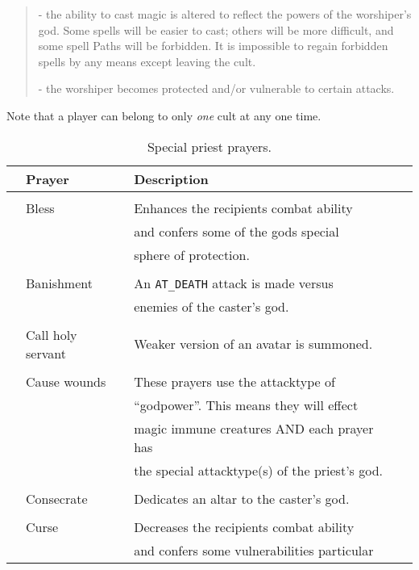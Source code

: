 {{{\begin{quote}
- the ability to cast magic is altered to reflect the powers
of the worshiper's god. Some spells will be easier to cast; others
will be more difficult, and some spell Paths will be forbidden.
It is impossible to regain forbidden spells by any means except
leaving the cult.

- the worshiper becomes protected and/or vulnerable to certain attacks.
\end{quote}
Note that a player can belong to only {\em one} cult at any one time.

\begin{table}
\begin{center}
\footnotesize
\caption{Special priest prayers. \label{tab:priest_prayer}} 
\vskip 12pt
\begin{tabular}{|p{0.5cm}llp{0.5cm}|} \hline
& Prayer & Description & \\ \hline\hline
 & & & \\
    &    Bless                   &  Enhances the recipients combat ability & \\
    &                                 &  and confers some of the gods special & \\
    &					& sphere of protection. & \\
 & & & \\
   &     Banishment 		&  An {\tt AT\_DEATH}\tablenotemark{1} attack is made versus & \\
	& & enemies of the caster's god. &  \\
 & & & \\
   &     Call holy servant     &  Weaker version of an avatar is summoned.& \\
 & & & \\
   &     Cause wounds	    &  These prayers use the attacktype of & \\
   &                                  &  ``godpower''. This means they will effect & \\
&				     & magic immune creatures AND each prayer has & \\
&				     & the special attacktype(s) of the priest's god. & \\
 & & & \\
&        Consecrate            &  Dedicates an altar to the caster's god.& \\
 & & & \\
&        Curse                  &  Decreases the recipients combat ability & \\
&                                     &  and confers some vulnerabilities particular & \\

\end{tabular}
\end{center}
\end{table}}}}
